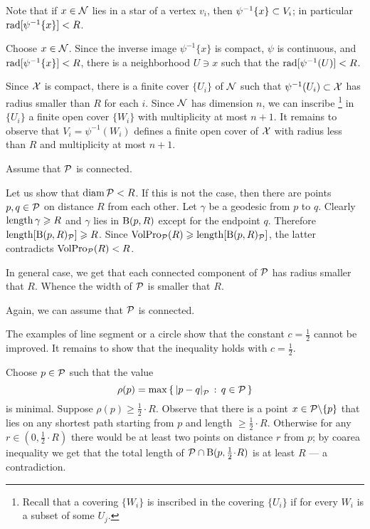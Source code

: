Note that if $x\in \mathcal{N}$ lies in a star of a vertex $v_i$,
then $\psi^{-1}\{x\}\z\subset V_i$;
in particular $\mathop{\rm rad}\nolimits[\psi^{-1}\{x\}]<R$.

Choose $x\in \mathcal{N}$.
Since the inverse image $\psi^{-1}\{x\}$ is compact, $\psi$ is continuous, and $\mathop{\rm rad}\nolimits[\psi^{-1}\{x\}]<R$,
there is a neighborhood $U\ni x$ such that the  $\mathop{\rm rad}\nolimits[\psi^{-1}(U)]<R$.

Since $\mathcal{X}$ is compact,  there is a finite cover $\{U_i\}$ of $\mathcal{N}$ such that $\psi^{-1}(U_i)\subset\mathcal{X}$ has radius smaller than $R$ for each $i$.
Since $\mathcal{N}$ has dimension $n$, we can inscribe%
\footnote{Recall that a covering $\{W_i\}$ is inscribed in the covering $\{U_i\}$ if for every $W_i$ is a subset of some $U_j$.} 
in $\{U_i\}$ a finite open cover $\{W_i\}$ with multiplicity at most $n+1$.
It remains to observe that $V_i=\psi^{-1}(W_i)$ defines a finite open cover of $\mathcal{X}$ with radius less than $R$ and multiplicity at most $n+1$. 


Assume that $\mathcal{P}$ is connected.

Let us show that $\operatorname{\rm diam}\nolimits\mathcal{P}<R$.
If this is not the case, then there are points $p,q\in\mathcal{P}$ on distance $R$ from each other.
Let $\gamma$ be a geodesic from $p$ to $q$.
Clearly $\mathop{\rm length}\nolimits\gamma\geqslant R$ and $\gamma$ lies in $\mathrm{B}{}(p,R)$ except for the endpoint $q$.
Therefore $\mathop{\rm length}\nolimits[\mathrm{B}{}(p,R)_{\mathcal{P}}]\geqslant R$.
Since $\VolPro_{\spc{P}}(R)\z\ge \length[\oBall(p,R)_{\spc{P}}]$,
the latter contradicts $\operatorname{\rm VolPro}\nolimits_{\mathcal{P}}(R)<R$.

In general case, we get that each connected component of $\mathcal{P}$ has radius smaller that $R$.
Whence the width of $\mathcal{P}$ is smaller that $R$.

 Again, we can assume that $\mathcal{P}$ is connected.

The examples of line segment or a circle show that the constant $c=\tfrac12$ cannot be improved.
It remains to show that the inequality holds with $c=\tfrac12$.

Choose $p\in\mathcal{P}$ such that the value
\[\rho(p)=\max\set{\dist{p}{q}{\spc{P}}}{q\in\spc{P}}\]
is minimal.
Suppose $\rho(p)\ge\tfrac 12\cdot R$.
Observe that there is a point $x\in \mathcal{P}\backslash\{p\}$ that lies on any shortest path starting from $p$ and length $\ge\tfrac 12\cdot R$.
Otherwise for any $r\in(0,\tfrac 12\cdot R)$ there would be at least two points on distance $r$ from $p$;
by coarea inequality we get that the total length of $\spc{P}\cap \oBall(p,\tfrac 12\cdot R)$ is at least $R$ --- a contradiction.

